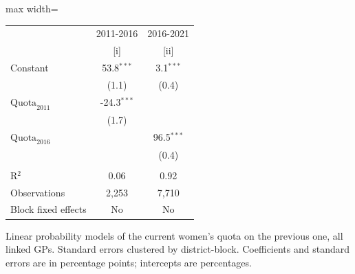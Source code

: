 
\begingroup
\centering
\scriptsize
\begin{adjustbox}{max width=\linewidth}
   \begin{threeparttable}[b]
      \begin{tabular}{lcc}
         \toprule
                                & 2011-2016     & 2016-2021 \\
                                & [i]           & [ii]\\
         \midrule
         Constant               & 53.8$^{***}$  & 3.1$^{***}$\\
                                & (1.1)         & (0.4)\\
         $\text{Quota}_{2011}$  & -24.3$^{***}$ &   \\
                                & (1.7)         &   \\
         $\text{Quota}_{2016}$  &               & 96.5$^{***}$\\
                                &               & (0.4)\\
          \\
         R$^2$                  & 0.06          & 0.92\\
         Observations           & 2,253         & 7,710\\
         Block fixed effects    & No            & No\\
         \bottomrule
      \end{tabular}

      \begin{tablenotes}
         \item Linear probability models of the current women's quota on the previous one, all linked GPs. Standard errors clustered by district-block. Coefficients and standard errors are in percentage points; intercepts are percentages.
      \end{tablenotes}
   \end{threeparttable}
\end{adjustbox}
\par\endgroup


